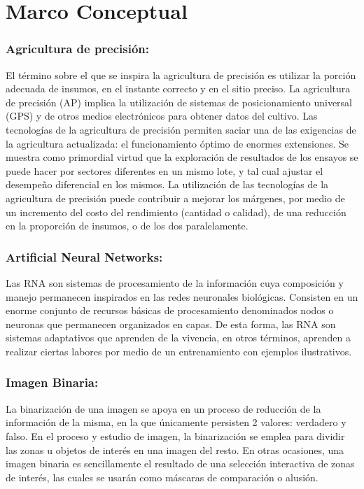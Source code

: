 \chapter{Marco Conceptual}

	\subsection{\textbf{Agricultura de precisión:}} El término sobre el que se inspira la agricultura de precisión es utilizar la porción adecuada de insumos, en el instante correcto y en el sitio preciso. La agricultura de precisión (AP) implica la utilización de sistemas de posicionamiento universal (GPS) y de otros medios electrónicos para obtener datos del cultivo. Las tecnologías de la agricultura de precisión permiten saciar una de las exigencias de la agricultura actualizada: el funcionamiento óptimo de enormes extensiones. Se muestra como primordial virtud que la exploración de resultados de los ensayos se puede hacer por sectores diferentes en un mismo lote, y tal cual ajustar el desempeño diferencial en los mismos. La utilización de las tecnologías de la agricultura de precisión puede contribuir a mejorar los márgenes, por medio de un incremento del costo del rendimiento (cantidad o calidad), de una reducción en la proporción de insumos, o de los dos paralelamente.
	\\
	\subsection{\textbf{Artificial Neural Networks:}} Las RNA son sistemas de procesamiento de la información cuya composición y manejo permanecen inspirados en las redes neuronales biológicas. Consisten en un enorme conjunto de recursos básicas de procesamiento denominados nodos o neuronas que permanecen organizados en capas. De esta forma, las RNA son sistemas adaptativos que aprenden de la vivencia, en otros términos, aprenden a realizar ciertas labores por medio de un entrenamiento con ejemplos ilustrativos.
	\\ 
	
	\subsection{\textbf{Imagen Binaria:}} La binarización de una imagen se apoya en un proceso de reducción de la información de la misma, en la que únicamente persisten 2 valores: verdadero y falso. En el proceso y estudio de imagen, la binarización se emplea para dividir las zonas u objetos de interés en una imagen del resto. En otras ocasiones, una imagen binaria es sencillamente el resultado de una selección interactiva de zonas de interés, las cuales se usarán como máscaras de comparación o alusión.
	\\ 
	
